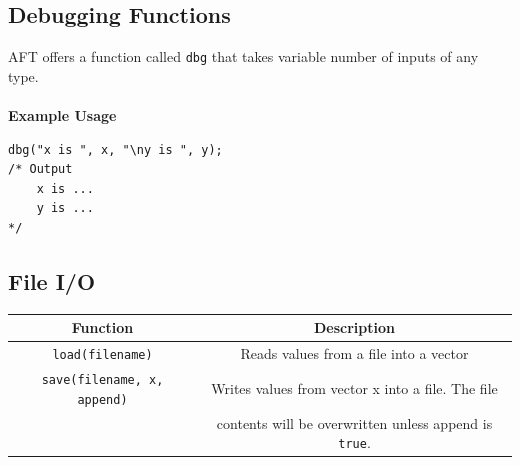 \subsection{Debugging Functions}
AFT offers a function called \texttt{dbg} that takes variable number of inputs of any type. \\\\
\textbf{Example Usage}\begin{verbatim}
dbg("x is ", x, "\ny is ", y);
/* Output
    x is ...
    y is ...
*/
\end{verbatim}
\subsection{File I/O}
\begin{table}[H]
    \centering
    \begin{tabular}{|c|c|}
        \hline
        \textbf{Function} & \textbf{Description} \\
        \hline
        \texttt{load(filename)} & Reads values from a file into a vector \\
        \texttt{save(filename, x, append)} & Writes values from vector x into a file. The file \\
        & contents will be overwritten unless append is \texttt{true}. \\
        \hline
    \end{tabular}
\end{table}